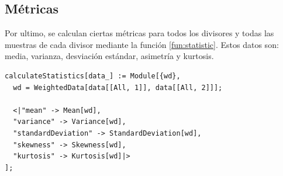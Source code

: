 \documentclass[12pt,twoside]{article}
\begin{document}
	\subsection{Métricas}
	Por ultimo, se calculan ciertas métricas para todos los divisores y todas las muestras de cada divisor mediante la función \ref{fun:statistic}. Estos datos son: media, varianza, desviación estándar, asimetría y kurtosis. 

\begin{lstlisting}[style=modernMathematica, label=fun:statistic, caption={Calculos estadisticos}]
calculateStatistics[data_] := Module[{wd},
  wd = WeightedData[data[[All, 1]], data[[All, 2]]];
 
  <|"mean" -> Mean[wd],
  "variance" -> Variance[wd],
  "standardDeviation" -> StandardDeviation[wd],
  "skewness" -> Skewness[wd],
  "kurtosis" -> Kurtosis[wd]|>
];
\end{lstlisting}
\end{document}
